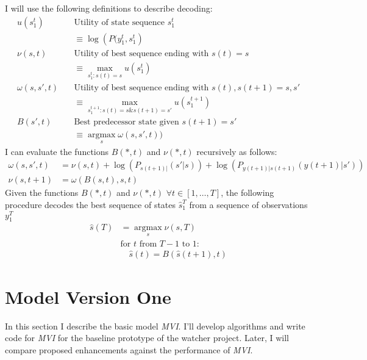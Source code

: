 \documentclass[12pt]{article}
\newcommand{\ti}[2]{{#1}{(#2)}}                         %
\newcommand{\ts}[4]{{#1}_{#3}^{#4}} %
\newcommand{\argmax}{\operatorname*{argmax}}
\begin{document}
I will use the following definitions to describe decoding:
\begin{align*}
  u(\ts{s}{\tau}{1}{t}) & \quad \text{Utility of state sequence }
  \ts{s}{\tau}{1}{t}\\
  & \quad \equiv \log \left( P(\ts{y}{\tau}{1}{t},\ts{s}{\tau}{1}{t} \right)
  \\
  \nu(s,t) & \quad \text{Utility of best sequence ending with }
  \ti{s}{t} = s \\ 
  &  \quad \equiv \max_{\ts{s}{\tau}{1}{t}:\ti{s}{t}=s} u(\ts{s}{\tau}{1}{t}) \\
  \omega(s,s',t) & \quad \text{Utility of best sequence ending with }
  \ti{s}{t},\ti{s}{t+1} = s,s' \\
  &  \quad \equiv \max_{\ts{s}{\tau}{1}{t+1}:\ti{s}{t}=s \&\ti{s}{t+1}=s'}
  u(\ts{s}{\tau}{1}{t+1}) \\
  B(s',t) & \quad \text{Best predecessor state given } \ti{s}{t+1}=s'\\
  & \quad \equiv \argmax_{s} \omega(s,s',t))
\end{align*}
I can evaluate the functions $B(*,t)$ and $\nu(*,t)$ recursively as
follows:
\begin{align*}
  \omega(s,s',t) &= \nu(s,t) + \log\left( P_{\ti{s}{t+1}|}(s'|s) \right) +
  \log\left( P_{\ti{y}{t+1}|\ti{s}{t+1}}(\ti{y}{t+1}|s') \right) \\
  \nu(s,t+1) &= \omega(B(s,t),s,t)
\end{align*}
Given the functions $B(*,t)$ and $\nu(*,t)$ $\forall
t\in[1,\ldots,T]$, the following procedure decodes the best sequence
of states $ \ts{\hat s}{\tau}{1}{T}$ from a sequence of observations $
\ts{y}{\tau}{1}{T}$
\begin{align*}
  {\ti{{\hat s}}{T}} &= \argmax_s \nu(s,T) \\
  & \text{for } t \text{ from } T-1 \text{ to } 1: \\
  & \quad \ti{\hat s}{t} = B( \ti{\hat s}{t+1},t)
\end{align*}

\section{Model Version One}
\label{sec:model1}

In this section I describe the basic model \emph{MVI}.  I'll develop
algorithms and write code for \emph{MVI} for the baseline prototype of
the watcher project.  Later, I will compare proposed enhancements
against the performance of \emph{MVI}.
\end{document}
